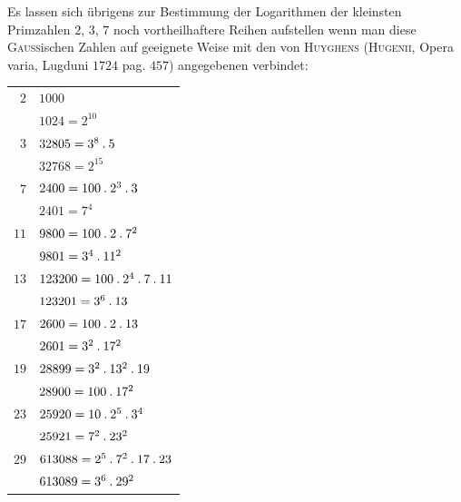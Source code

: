 Es lassen sich übrigens zur Bestimmung der Logarithmen der kleinsten Primzahlen $2$, $3$, $7$ noch vortheilhaftere Reihen aufstellen wenn man diese \textsc{Gauss}ischen Zahlen auf geeignete Weise mit den von \textsc{Huyghens} (\textsc{Hugenii}, Opera varia, Lugduni $1724$ pag. $457$) angegebenen verbindet:
\begingroup\renewcommand{\arraystretch}{1.15}
\begin{longtable}{@{}rl@{}}
$2$ & $1000$\\
 & $1024=2^{10}$\\
$3$ & $32805=3^8\mathbin{.} 5$\\
 & $32768=2^{15}$\\
$7$ & $2400=100\mathbin{.} 2^3\mathbin{.} 3$\\
 & $2401=7^4$\\
$11$ & $9800=100\mathbin{.} 2\mathbin{.} 7^2$\\
 & $9801=3^4\mathbin{.} 11^2$\\
$13$ & $123200=100\mathbin{.} 2^4\mathbin{.} 7\mathbin{.} 11$\\
 & $123201=3^6\mathbin{.} 13$\\
$17$ & $2600=100\mathbin{.} 2\mathbin{.} 13$\\
 & $2601=3^2\mathbin{.} 17^2$\\
$19$ & $28899=3^2\mathbin{.} 13^2\mathbin{.} 19$\\
 & $28900=100\mathbin{.} 17^2$\\
$23$ & $25920=10\mathbin{.} 2^5\mathbin{.} 3^4$\\
 & $25921=7^2\mathbin{.} 23^2$\\
$29$ & $613088=2^5\mathbin{.} 7^2\mathbin{.} 17\mathbin{.} 23$\\
 & $613089=3^6\mathbin{.} 29^2$\\
\end{longtable}\endgroup
